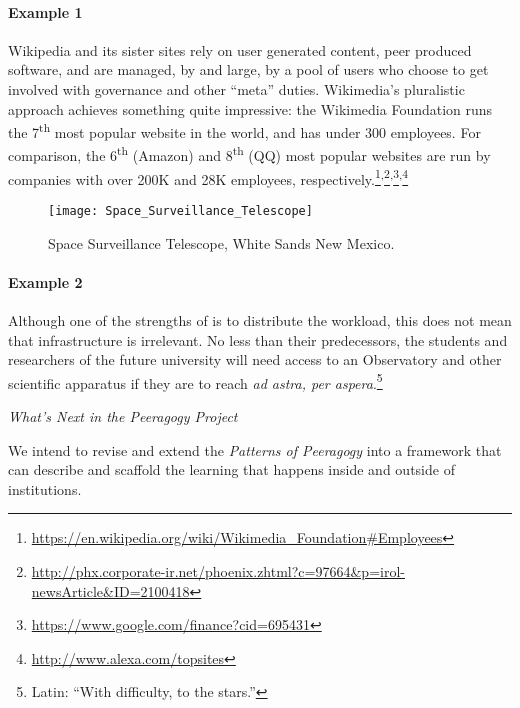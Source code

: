 \begin{refsection}
\paragraph{Example 1} Wikipedia and its sister sites rely on user generated content,
peer produced software, and are managed, by and large, by a pool of users who choose to
get involved with governance and other ``meta'' duties.
%
Wikimedia's pluralistic approach achieves something quite impressive: the
Wikimedia Foundation runs the 7\textsuperscript{th} most popular
website in the world, and has under 300 employees.  For comparison,
the 6\textsuperscript{th} (Amazon) and 8\textsuperscript{th} (QQ) most popular
websites are run by companies with over 200K and 28K employees,
respectively.\footnote{\url{https://en.wikipedia.org/wiki/Wikimedia_Foundation\#Employees}}\textsuperscript{,}\footnote{\url{http://phx.corporate-ir.net/phoenix.zhtml?c=97664&p=irol-newsArticle&ID=2100418}}\textsuperscript{,}\footnote{\url{https://www.google.com/finance?cid=695431}}\textsuperscript{,}\footnote{\url{http://www.alexa.com/topsites}}


\begin{wrapfigure}{r}{.42\textwidth}
\vspace{-1.1cm}
\begin{center}
\texttt{[image: Space\_Surveillance\_Telescope]}
\end{center}
\vspace{-.7cm}
\caption{Space Surveillance Telescope, White Sands New Mexico.
\label{space-surveillance}}
\vspace{-1.1cm}
\end{wrapfigure}

\paragraph{Example 2} Although one of the strengths of  is to
distribute the workload, this does not mean that infrastructure is
irrelevant.  No less than their predecessors, the students and
researchers of the future university will need access to an
Observatory and other scientific apparatus if they are to
reach \emph{ad astra, per aspera}.\footnote{Latin: ``With difficulty, to the stars.''}

\begin{framed}
\noindent 
\emph{What's Next in the Peeragogy Project}
\begin{collectinmacro}{\PeeragogyWN}{}{}
We intend to revise and extend the \emph{Patterns of Peeragogy} into a framework that can describe and scaffold the learning that happens inside and outside of institutions.
\end{collectinmacro}
\PeeragogyWN
\end{framed}

\printbibliography[heading=subbibliography]
\end{refsection}
